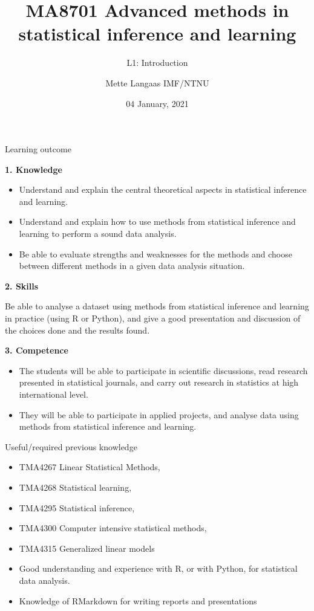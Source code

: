 \documentclass[
  ignorenonframetext,
]{beamer}
\title{MA8701 Advanced methods in statistical inference and learning}
\subtitle{L1: Introduction}
\author{Mette Langaas IMF/NTNU}
\date{04 January, 2021}
\providecommand{\tightlist}{%
  \setlength{\itemsep}{0pt}\setlength{\parskip}{0pt}}
\begin{document}
\frame{\titlepage}

\begin{frame}{Learning outcome}
\protect\hypertarget{learning-outcome}{}

\textbf{1. Knowledge}

\begin{itemize}
\tightlist
\item
  Understand and explain the central theoretical aspects in statistical
  inference and learning.
\item
  Understand and explain how to use methods from statistical inference
  and learning to perform a sound data analysis.
\item
  Be able to evaluate strengths and weaknesses for the methods and
  choose between different methods in a given data analysis situation.
\end{itemize}

\end{frame}

\begin{frame}

\textbf{2. Skills}

Be able to analyse a dataset using methods from statistical inference
and learning in practice (using R or Python), and give a good
presentation and discussion of the choices done and the results found.

\textbf{3. Competence}

\begin{itemize}
\tightlist
\item
  The students will be able to participate in scientific discussions,
  read research presented in statistical journals, and carry out
  research in statistics at high international level.
\item
  They will be able to participate in applied projects, and analyse data
  using methods from statistical inference and learning.
\end{itemize}

\end{frame}

\begin{frame}{Useful/required previous knowledge}
\protect\hypertarget{usefulrequired-previous-knowledge}{}

\begin{itemize}
\tightlist
\item
  TMA4267 Linear Statistical Methods,
\item
  TMA4268 Statistical learning,
\item
  TMA4295 Statistical inference,
\item
  TMA4300 Computer intensive statistical methods,
\item
  TMA4315 Generalized linear models
\item
  Good understanding and experience with R, or with Python, for
  statistical data analysis.
\item
  Knowledge of RMarkdown for writing reports and presentations
\end{itemize}

\end{frame}
\end{document}
